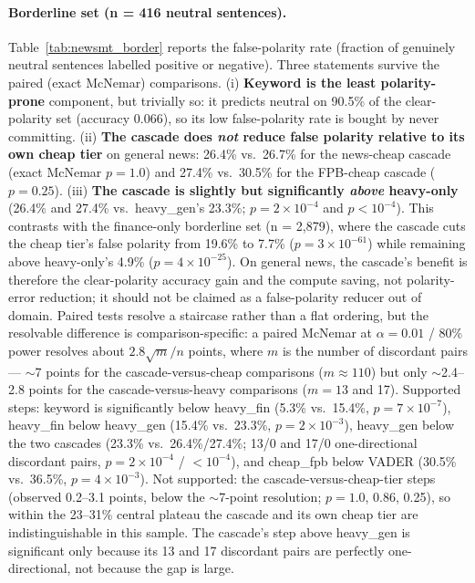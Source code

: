 \documentclass{article}
\begin{document}
\paragraph{Borderline set (n = 416 neutral sentences).}
Table~\ref{tab:newsmt_border} reports the false-polarity rate (fraction of
genuinely neutral sentences labelled positive or negative). Three statements
survive the paired (exact McNemar) comparisons. (i) \textbf{Keyword is the least
polarity-prone} component, but trivially so: it predicts neutral on 90.5\% of the
clear-polarity set (accuracy 0.066), so its low false-polarity rate is bought by
never committing. (ii) \textbf{The cascade does \emph{not} reduce false polarity
relative to its own cheap tier} on general news: 26.4\% vs.\ 26.7\% for the
news-cheap cascade (exact McNemar $p = 1.0$) and 27.4\% vs.\ 30.5\% for the
FPB-cheap cascade ($p = 0.25$). (iii) \textbf{The cascade is slightly but
significantly \emph{above} heavy-only} (26.4\% and 27.4\% vs.\ heavy\_gen's
23.3\%; $p = 2\times10^{-4}$ and $p < 10^{-4}$). This contrasts with the
finance-only borderline set (n = 2,879), where the cascade cuts the cheap tier's
false polarity from 19.6\% to 7.7\% ($p = 3\times10^{-61}$) while remaining
above heavy-only's 4.9\% ($p = 4\times10^{-25}$). On general news, the cascade's
    benefit is therefore the clear-polarity accuracy gain and the compute saving, not
    polarity-error reduction; it should not be claimed as a false-polarity reducer
    out of domain. Paired tests resolve a staircase rather than a flat ordering,
    but the resolvable difference is comparison-specific: a paired McNemar at
    $\alpha = 0.01$ / 80\% power resolves about $2.8\sqrt{m}/n$ points, where $m$
    is the number of discordant pairs --- $\sim$7 points for the
    cascade-versus-cheap comparisons ($m \approx 110$) but only $\sim$2.4--2.8
    points for the cascade-versus-heavy comparisons ($m = 13$ and 17). Supported
    steps: keyword is significantly below heavy\_fin (5.3\% vs.\ 15.4\%,
    $p = 7\times10^{-7}$), heavy\_fin below heavy\_gen (15.4\% vs.\ 23.3\%,
    $p = 2\times10^{-3}$), heavy\_gen below the two cascades (23.3\% vs.\
    26.4\%/27.4\%; 13/0 and 17/0 one-directional discordant pairs,
    $p = 2\times10^{-4}$ / $<10^{-4}$), and cheap\_fpb below VADER (30.5\% vs.\
    36.5\%, $p = 4\times10^{-3}$). Not supported: the cascade-versus-cheap-tier
    steps (observed 0.2--3.1 points, below the $\sim$7-point resolution; $p =
    1.0$, 0.86, 0.25), so within the 23--31\% central plateau the cascade and its
    own cheap tier are indistinguishable in this sample. The cascade's step above
    heavy\_gen is significant only because its 13 and 17 discordant pairs are
    perfectly one-directional, not because the gap is large.
\end{document}
